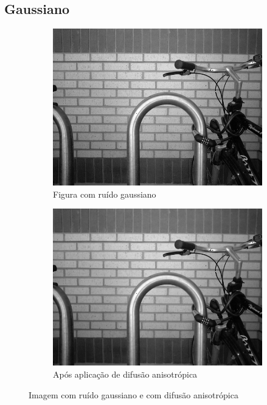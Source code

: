 \documentclass[10pt,a4paper]{article}
\begin{document}
\subsection{Gaussiano}

\begin{figure}[!ht]
    \centering
    \begin{subfigure}[ht]{0.4\textwidth}
        \includegraphics[width=\textwidth]{dst_ga.jpg}
        \caption{Figura com ruído gaussiano\cite{bike}}
        \label{fig:src_ga}
    \end{subfigure}
    \qquad
    \begin{subfigure}[ht]{0.4\textwidth}
        \includegraphics[width=\textwidth]{aniso_ga.jpg}
        \caption{\centering Após aplicação de difusão anisotrópica}
        \label{fig:aniso_diff_ga}
    \end{subfigure}
    \caption{Imagem com ruído gaussiano e com difusão anisotrópica}
    \label{fig:aniso_diff_ga}
\end{figure}
\end{document}
